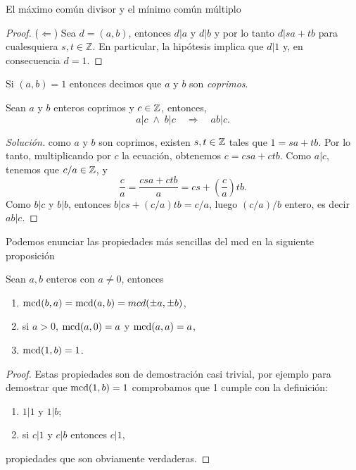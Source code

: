 \begin{section}{El máximo común divisor y el mínimo común múltiplo}
\begin{proof}
    ($\Leftarrow$) Sea $d = (a,b)$, entonces $d|a$ y $d|b$ y por lo tanto $d|sa+tb$ para cualesquiera   $s,t \in \mathbb Z$.  En particular, la hipótesis implica que $d | 1$ y, en consecuencia $d =1$. 
\end{proof}

\begin{definicion}
    Si $(a,b)=1$ entonces decimos que $a$ y $ b$ son \textit{coprimos}.
\end{definicion}


\begin{ejemplo*}
    Sean $a$ y $b$ enteros coprimos y $c \in \mathbb Z$, entonces,
    $$
    a|c \; \wedge \; b|c  \quad \Rightarrow \quad ab|c.
    $$
\end{ejemplo*}
\begin{proof}[Solución] como $a$ y $b$ son coprimos, existen $s,t \in \mathbb Z$ tales que $1 = sa+tb$. Por lo tanto,  multiplicando por $c$ la ecuación,  obtenemos $c = csa + ctb$. Como $a|c$, tenemos que $c/a \in \mathbb Z$, y 
$$
\frac{c}{a} = \frac{csa + ctb}{a} = cs + (\frac{c}{a})tb.
$$ 
Como $b|c$ y $b|b$, entonces $b |cs +(c/a)tb =c/a$, luego $(c/a)/b$ entero,  es decir $ab|c$.     
\end{proof}







Podemos enunciar las propiedades más sencillas del mcd en la siguiente proposición

\begin{proposicion} Sean $a,b$ enteros con $a \not = 0$, entonces
    \begin{enumerate}
        \item $\operatorname{mcd}(b,a) = \operatorname{mcd}(a,b) = mcd(\pm a, \pm b)$,
        \item si $a>0$,  $\operatorname{mcd}(a,0) = a$ y $\operatorname{mcd}(a,a) = a$,
        \item $\operatorname{mcd}(1,b) = 1$.
    \end{enumerate}
\end{proposicion}
\begin{proof}
    Estas propiedades son de demostración casi trivial, por ejemplo para demostrar que  $\operatorname{mcd}(1,b) = 1$ comprobamos que 1 cumple con la definición:
    \begin{enumerate}[label=\textit{\alph*)}]
        \item $ 1|1$ y $1|b$;
        \item si $ c|1 $ y $c|b$ entonces $ c|1$,
    \end{enumerate}
    propiedades que son obviamente verdaderas.
    

\end{proof}
\end{section}
